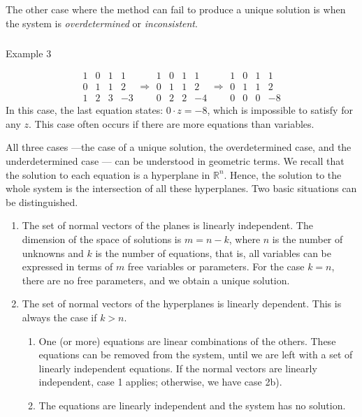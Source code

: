 \documentclass[
  letterpaper,
  DIV=11,
  numbers=noendperiod]{scrartcl}
\makeatletter
\let\oldsubparagraph\subparagraph
\renewcommand{\subparagraph}{
    \@ifstar
      \xxxSubParagraphStar
      \xxxSubParagraphNoStar
  }
\newcommand{\xxxSubParagraphStar}[1]{\oldsubparagraph*{#1}\mbox{}}
\newcommand{\xxxSubParagraphNoStar}[1]{\oldsubparagraph{#1}\mbox{}}
\theoremstyle{remark}
\makeatother
\begin{document}
The other case where the method can fail to produce a unique solution is
when the system is \emph{overdetermined} or \emph{inconsistent}.

\subparagraph{Example 3}\label{example-3}

\[\begin{array}{rrr|r}
  1 & 0& 1 &1 \\
   0& 1 & 1  & 2 \\
    1 & 2 & 3 & -3    
\end{array}
\Rightarrow
\begin{array}{rrr|r}
  1 & 0& 1 &1 \\
   0& 1 & 1  & 2 \\
    0 & 2 & 2 & -4    
\end{array}
\Rightarrow
\begin{array}{rrr|r}
  1 & 0& 1 &1 \\
   0& 1 & 1  & 2 \\
    0 & 0 & 0 & -8    
\end{array}\] In this case, the last equation states: \(0\cdot z=-8\),
which is impossible to satisfy for any \(z\). This case often occurs if
there are more equations than variables.

All three cases ---the case of a unique solution, the overdetermined
case, and the underdetermined case --- can be understood in geometric
terms. We recall that the solution to each equation is a hyperplane in
\(\mathbb{R}^{n}\). Hence, the solution to the whole system is the
intersection of all these hyperplanes. Two basic situations can be
distinguished.

\begin{enumerate}
\def\labelenumi{\arabic{enumi}.}
\item
  The set of normal vectors of the planes is linearly independent. The
  dimension of the space of solutions is \(m=n-k\), where \(n\) is the
  number of unknowns and \(k\) is the number of equations, that is, all
  variables can be expressed in terms of \(m\) free variables or
  parameters. For the case \(k=n\), there are no free parameters, and we
  obtain a unique solution.
\item
  The set of normal vectors of the hyperplanes is linearly dependent.
  This is always the case if \(k>n\).

  \begin{enumerate}
  \def\labelenumii{\arabic{enumii}.}
  \item
    One (or more) equations are linear combinations of the others. These
    equations can be removed from the system, until we are left with a
    set of linearly independent equations. If the normal vectors are
    linearly independent, case 1 applies; otherwise, we have case 2b).
  \item
    The equations are linearly independent and the system has no
    solution.
  \end{enumerate}
\end{enumerate}
\end{document}
